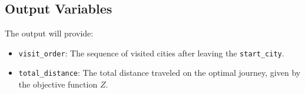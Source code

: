 \documentclass{article}
\begin{document}
\subsection*{Output Variables}
The output will provide:
\begin{itemize}
    \item \texttt{visit\_order}: The sequence of visited cities after leaving the \texttt{start\_city}.
    \item \texttt{total\_distance}: The total distance traveled on the optimal journey, given by the objective function \( Z \).
\end{itemize}
\end{document}

